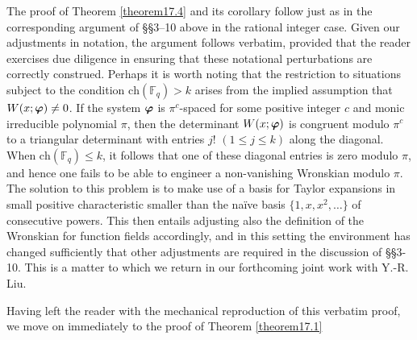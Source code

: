 \documentclass[12pt,reqno]{amsart}
\theoremstyle{definition}
\theoremstyle{remark}
\numberwithin{equation}{section}
\def\dbF{{\mathbb F}}\def\dbK{{\mathbb K}}
\def\le{\leqslant} \def\ge{\geqslant} \def\pleq{\preccurlyeq} \def\ple{\prec}
\begin{document}
The proof of Theorem \ref{theorem17.4} and its corollary follow just as in the 
corresponding argument of \S\S3--10 above in the rational integer case. Given our 
adjustments in notation, the argument follows verbatim, provided that the reader exercises 
due diligence in ensuring that these notational perturbations are correctly construed. 
Perhaps it is worth noting that the restriction to situations subject to the condition 
$\text{ch}(\dbF_q)>k$ arises from the implied assumption that $W(x;{\boldsymbol \varphi})\ne 0$. If 
the system ${\boldsymbol \varphi}$ is $\pi^c$-spaced for some positive integer $c$ and monic 
irreducible polynomial $\pi$, then the determinant $W(x;{\boldsymbol \varphi})$ is congruent modulo 
$\pi^c$ to a triangular determinant with entries $j!$ $(1\le j\le k)$ along the diagonal. 
When $\text{ch}(\dbF_q)\le k$, it follows that one of these diagonal entries is zero modulo 
$\pi$, and hence one fails to be able to engineer a non-vanishing Wronskian modulo $\pi$. 
The solution to this problem is to make use of a basis for Taylor expansions in small positive 
characteristic smaller than the na\"ive basis $\{1,x,x^2,\ldots \}$ of consecutive powers. 
This then entails adjusting also the definition of the Wronskian for function fields accordingly, 
and in this setting the environment has changed sufficiently that other adjustments are 
required in the discussion of \S\S3-10. This is a matter to which we return in our 
forthcoming joint work with Y.-R. Liu.\par

Having left the reader with the mechanical reproduction of this verbatim proof, we move on 
immediately to the proof of Theorem \ref{theorem17.1}
\end{document}
